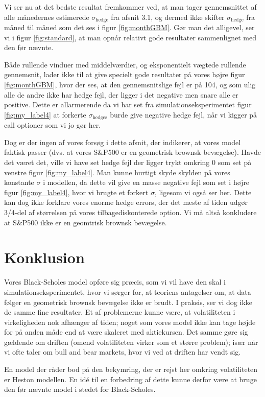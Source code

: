 \documentclass{article}
\theoremstyle{definition}
\theoremstyle{remark}
\begin{document}
Vi ser nu at det bedste resultat fremkommer ved, at man tager gennemsnittet af alle månedernes estimerede $\sigma_\text{hedge}$ fra afsnit 3.1, og dermed ikke skifter $\sigma_\text{hedge}$ fra måned til måned som det ses i figur \ref{fig:monthGBM}. Gør man det alligevel, ser vi i figur \ref{fig:standard}, at man opnår relativt gode resultater sammenlignet med den før nævnte.

Både rullende vinduer med middelværdier, og eksponentielt vægtede rullende gennemsnit, lader ikke til at give specielt gode resultater på vores højre figur \ref{fig:monthGBM}, hvor der ses, at den gennemsnitslige fejl er på 104, og som ulig alle de andre ikke har hedge fejl, der ligger i det negative men snare alle er positive. Dette er allarmerende da vi har set fra simulationseksperimentet figur \ref{fig:my_label4} at forkerte $\sigma_\text{hedges}$ burde give negative hedge fejl, når vi kigger på call optioner som vi jo gør her.

Dog er der ingen af vores forsøg i dette afsnit, der indikerer, at vores model faktisk passer (dvs. at vores S\&P500 er en geometrisk brownsk bevægelse). Havde det været det, ville vi have set hedge fejl der ligger trykt omkring 0 som set på venstre figur \ref{fig:my_label4}. Man kunne hurtigt skyde skylden på vores konstante $\sigma$ i modellen, da dette vil give en masse negative fejl som set i højre figur \ref{fig:my_label4}, hvor vi brugte et forkert $\sigma$, ligesom vi også ser her. Dette kan dog ikke forklare vores enorme hedge errors, der det meste af tiden udgør 3/4-del af størrelsen på vores tilbagediskonterede option. Vi må altså konkludere at S\&P500 ikke er en geomtrisk brownsk bevægelse.

\newpage

\section{Konklusion}
Vores Black-Scholes model opføre sig præcis, som vi vil have den skal i simulationseksperimentet, hvor vi sørger for, at teoriens antagelser om, at data følger en geometrisk brownsk bevægelse ikke er brudt. I praksis, ser vi dog ikke de samme fine resultater. Et af problemerne kunne være, at volatiliteten i virkeligheden nok afhænger af tiden; noget som vores model ikke kan tage højde for på anden måde end at være skaleret med aktiekursen. Det samme gøre sig gældende om driften (omend volatiliteten virker som et større problem); især når vi ofte taler om bull and bear markets, hvor vi ved at driften har vendt sig.

En model der råder bod på den bekymring, der er rejst her omkring volatiliteten er Heston modellen. En idé til en forbedring af dette kunne derfor være at bruge den før nævnte model i stedet for Black-Scholes.
\newpage



%


\end{document}
